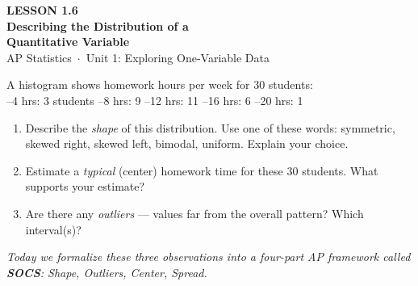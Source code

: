 \documentclass[aspectratio=169, 11pt]{beamer}
\begin{document}
{
\begin{frame}[plain]
  \vspace{2.8cm}
  \hspace{0.55cm}%
  \begin{minipage}{0.9\textwidth}
    {\color{goldacc}\bfseries\small LESSON 1.6}\\[0.5cm]
    {\color{white}\bfseries\LARGE Describing the Distribution of a\\[0.25cm]
      Quantitative Variable}\\[1.4cm]
    {\color{skymid}\small AP Statistics~$\cdot$~Unit 1: Exploring One-Variable Data}
  \end{minipage}
\end{frame}
}

{
\begin{frame}[t, plain]
  \vspace{1em}%
  \hspace{0.55cm}%
  \begin{minipage}{0.9\textwidth}
    \small

    A histogram shows homework hours per week for 30 students:\\[6pt]
    --4 hrs: 3 students --8 hrs: 9 --12 hrs: 11 --16 hrs: 6 --20 hrs: 1

    \vspace{0.6em}
    \begin{enumerate}
      \setlength{\itemsep}{0.7em}\setlength{\topsep}{0em}
      \item Describe the \textit{shape} of this distribution. Use one of
            these words: symmetric, skewed right, skewed left, bimodal,
            uniform. Explain your choice.
      \item Estimate a \textit{typical} (center) homework time for these
            30 students. What supports your estimate?
      \item Are there any \textit{outliers} --- values far from the overall
            pattern? Which interval(s)?
    \end{enumerate}

    \vspace{0.5cm}
    {\color{navy}\itshape\small
      Today we formalize these three observations into a four-part AP
      framework called \textbf{SOCS}: Shape, Outliers, Center, Spread.}
  \end{minipage}
\end{frame}
}
\end{document}
